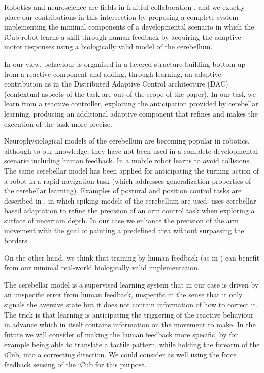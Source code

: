 \documentclass[letterpaper, 10 pt, conference]{ieeeconf}  %
\begin{document}
Robotics and neuroscience are fields in fruitful collaboration \cite{floreano2014robotics}, and we exactly place our contributions in this intersection by proposing a complete system implementing the minimal components of a developmental scenario in which the iCub robot learns a skill through human feedback by acquiring the adaptive motor responses using a biologically valid model of the cerebellum.

In our view, behaviour is organised in a layered structure building bottom up from a reactive component and adding, through learning, an adaptive contribution
as in the Distributed Adaptive Control architecture (DAC) \cite{verschure2003environmentally} (contextual aspects of the task are out of the scope of the paper). In our task we learn from a reactive controller, exploiting the anticipation provided by cerebellar learning, producing an additional adaptive component that refines and makes the execution of the task more precise. 

Neurophysiological models of the cerebellum are becoming popular in robotics, although to our knowledge, they have not been used in a complete developmental scenario including human feedback. In \cite{hofstoetter2002cerebellum} a mobile robot learns to avoid collisions. The same cerebellar model has been applied for anticipating the turning action of a robot in a rapid navigation task  \cite{herreros2013speed} (which addresses generalization properties of the cerebellar learning). Examples of postural and position control tasks are described in \cite{pinzon2015realistic}, in which spiking models of the cerebellum are used. \cite{barron2013cerebellum} uses cerebellar based adaptation to refine the precision of an arm control task when exploring a surface of uncertain depth. In our case we enhance the precision of the arm movement with the goal of painting a predefined area without surpassing the borders.   

On the other hand, we think that training by human feedback (as in \cite{knox2013training}) can benefit from our minimal real-world biologically valid implementation.


The cerebellar model is a supervised learning system that in our case is driven by an unspecific error from human feedback, unspecific in the sense that it only signals the aversive state but it does not contain information of how to correct it. The trick is that learning is anticipating the triggering of the reactive behaviour in advance which in itself contains information on the movement to make.
In the future we will consider of making the human feedback more specific, by for example being able to translate a tactile pattern, while holding the forearm of the iCub, into a correcting direction. We could consider as well using the force feedback sensing of the iCub for this purpose.
\end{document}
